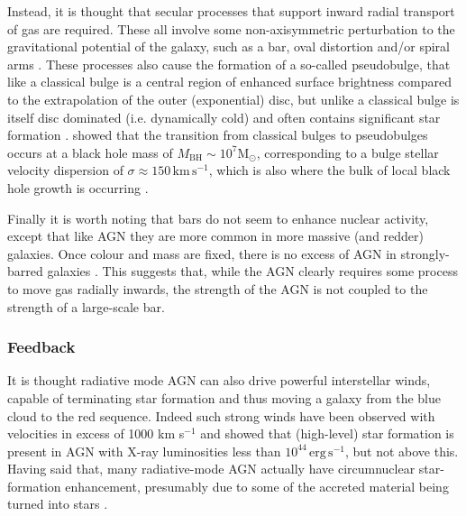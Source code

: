 			Instead, it is thought that secular processes that support inward radial transport of gas are required. These all involve some non-axisymmetric perturbation to the gravitational potential of the galaxy, such as a bar, oval distortion and/or spiral arms \citep[e.g.][]{Kormendy2004, Athanassoula2008, Sellwood2014}. These processes also cause the formation of a so-called pseudobulge, that like a classical bulge is a central region of enhanced surface brightness compared to the extrapolation of the outer (exponential) disc, but unlike a classical bulge is itself disc dominated (i.e. dynamically cold) and often contains significant star formation \citep[e.g.][]{Gadotti2009}. \citet{Kormendy2013a} showed that the transition from classical bulges to pseudobulges occurs at a black hole mass of $M_\text{BH} \sim 10^7 \mathrm{M_\odot}$, corresponding to a bulge stellar velocity dispersion of $\sigma \approx 150 \, \mathrm{km \, s^{-1}}$, which is also where the bulk of local black hole growth is occurring \citep[e.g.][]{Heckman2004, Kauffmann2009}. 

			Finally it is worth noting that bars do not seem to enhance nuclear activity, except that like AGN they are more common in more massive (and redder) galaxies. Once colour and mass are fixed, there is no excess of AGN in strongly-barred galaxies \citep[e.g.][]{Lee2012, Cisternas2013}. This suggests that, while the AGN clearly requires some process to move gas radially inwards, the strength of the AGN is not coupled to the strength of a large-scale bar. 


		\subsubsection{Feedback}
			\label{subsubsec:RadiativeFeedback}
			It is thought radiative mode AGN can also drive powerful interstellar winds, capable of terminating star formation and thus moving a galaxy from the blue cloud to the red sequence. Indeed such strong winds have been observed with velocities in excess of 1000 km s$^{-1}$ \citep{Fischer2010, Feruglio2010, Rupke2011} and \citet{Page2012} showed that (high-level) star formation is present in AGN with X-ray luminosities less than $10^{44} \, \mathrm{erg \, s^{-1}}$, but not above this. Having said that, many radiative-mode AGN actually have circumnuclear star-formation enhancement, presumably due to some of the accreted material being turned into stars \citep[e.g.][]{Santini2012}. 

